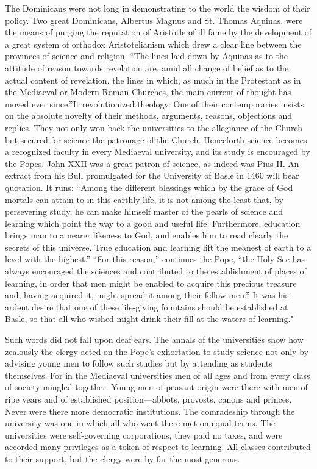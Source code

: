 \documentclass{book}
\begin{document}
The Dominicans were not long in demonstrating to the world the wisdom of their policy. Two great Dominicans, Albertus Magnus and St. Thomas Aquinas, were the means of purging the reputation of Aristotle of ill fame by the development of a great system of orthodox Aristotelianism which drew a clear line between the provinces of science and religion. “The lines laid down by Aquinas as to the attitude of reason towards revelation are, amid all change of belief as to the actual content of revelation, the lines in which, as much in the Protestant as in the Mediaeval or Modern Roman Churches, the main current of thought has moved ever since.”\footnotemark[6] It revolutionized theology. One of their contemporaries insists on the absolute novelty of their methods, arguments, reasons, objections and replies. They not only won back the universities to the allegiance of the Church but secured for science the patronage of the Church. Henceforth science becomes a recognized faculty in every Mediaeval university, and its study is encouraged by the Popes. John XXII was a great patron of science, as indeed was Pius II. An extract from his Bull promulgated for the University of Basle in 1460 will bear quotation. It runs: “Among the different blessings which by the grace of God mortals can attain to in this earthly life, it is not among the least that, by persevering study, he can make himself master of the pearls of science and learning which point the way to a good and useful life. Furthermore, education brings man to a nearer likeness to God, and enables him to read clearly the secrets of this universe. True education and learning lift the meanest of earth to a level with the highest.” “For this reason,” continues the Pope, “the Holy See has always encouraged the sciences and contributed to the establishment of places of learning, in order that men might be enabled to acquire this precious treasure and, having acquired it, might spread it among their fellow-men.” It was his ardent desire that one of these life-giving fountains should be established at Basle, so that all who wished might drink their fill at the waters of learning."\footnotemark[1]

Such words did not fall upon deaf ears. The annals of the universities show how zealously the clergy acted on the Pope’s exhortation to study science not only by advising young men to follow such studies but by attending as students themselves. For in the Mediaeval universities men of all ages and from every class of society mingled together. Young men of peasant origin were there with men of ripe years and of established position—abbots, provosts, canons and princes. Never were there more democratic institutions. The comradeship through the university was one in which all who went there met on equal terms. The universities were self-governing corporations, they paid no taxes, and were accorded many privileges as a token of respect to learning. All classes contributed to their support, but the clergy were by far the most generous.
\end{document}
